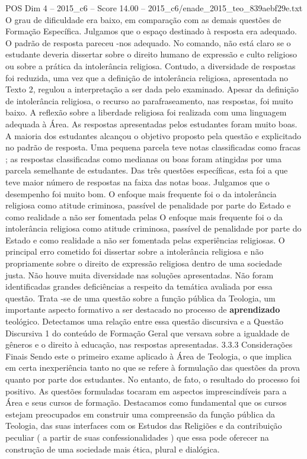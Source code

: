 \begin{textsample}{POS Dim 4 – 2015\_c6 – Score 14.00 – 2015\_c6/enade\_2015\_teo\_839aebf29e.txt}
O grau de dificuldade era baixo, em comparação com as demais questões de Formação Específica.
Julgamos que o espaço destinado à resposta era adequado.
O padrão de resposta pareceu -nos adequado.
No comando, não está claro se o estudante deveria dissertar sobre o direito humano de expressão e culto religioso ou sobre a prática da intolerância religiosa.
Contudo, a diversidade de respostas foi reduzida, uma vez que a definição de intolerância religiosa, apresentada no Texto 2, regulou a interpretação a ser dada pelo examinado.
Apesar da definição de intolerância religiosa, o recurso ao parafraseamento, nas respostas, foi muito baixo.
A reflexão sobre a liberdade religiosa foi realizada com uma linguagem adequada à Área.
As respostas apresentadas pelos estudantes foram muito boas.
A maioria dos estudantes alcançou o objetivo proposto pela questão e explicitado no padrão de resposta.
Uma pequena parcela teve notas classificadas como fracas ; as respostas classificadas como medianas ou boas foram atingidas por uma parcela semelhante de estudantes.
Das três questões específicas, esta foi a que teve maior número de respostas na faixa das notas boas.
Julgamos que o desempenho foi muito bom.
O enfoque mais frequente foi o da intolerância religiosa como atitude criminosa, passível de penalidade por parte do Estado e como realidade a não ser fomentada pelas O enfoque mais frequente foi o da intolerância religiosa como atitude criminosa, passível de penalidade por parte do Estado e como realidade a não ser fomentada pelas experiências religiosas.
O principal erro cometido foi dissertar sobre a intolerância religiosa e não propriamente sobre o direito de expressão religiosa dentro de uma sociedade justa.
Não houve muita diversidade nas soluções apresentadas.
Não foram identificadas grandes deficiências a respeito da temática avaliada por essa questão.
Trata -se de uma questão sobre a função pública da Teologia, um importante aspecto formativo a ser destacado no processo de \textbf{aprendizado} teológico.
Detectamos uma relação entre essa questão discursiva e a Questão Discursiva 1 do conteúdo de Formação Geral que versava sobre a igualdade de gêneros e o direito à educação, nas respostas apresentadas. 3.3.3 Considerações Finais Sendo este o primeiro exame aplicado à Área de Teologia, o que implica em certa inexperiência tanto no que se refere à formulação das questões da prova quanto por parte dos estudantes.
No entanto, de fato, o resultado do processo foi positivo.
As questões formuladas tocaram em aspectos imprescindíveis para a Área e seus cursos de formação.
Destacamos como fundamental que os cursos estejam preocupados em construir uma compreensão da função pública da Teologia, das suas interfaces com os Estudos das Religiões e da contribuição peculiar ( a partir de suas confessionalidades ) que essa pode oferecer na construção de uma sociedade mais ética, plural e dialógica.

\end{textsample}
